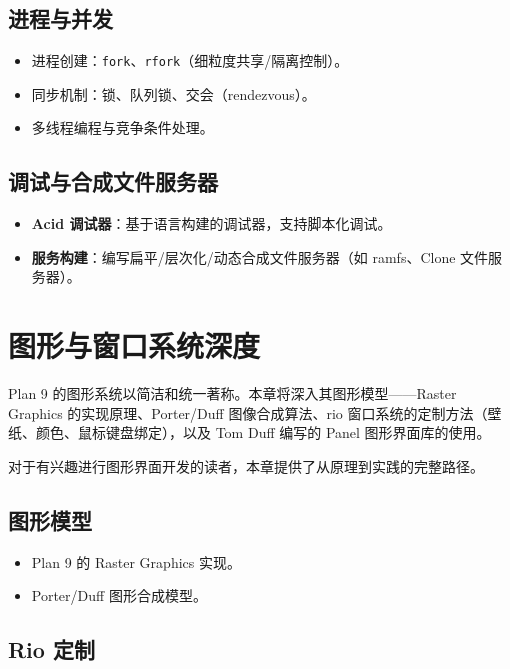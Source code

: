 \documentclass[12pt,UTF8]{ctexbook}
\begin{document}
\section{进程与并发}

\begin{itemize}
\item 进程创建：\texttt{fork}、\texttt{rfork}（细粒度共享/隔离控制）。
\item 同步机制：锁、队列锁、交会（rendezvous）。
\item 多线程编程与竞争条件处理。
\end{itemize}

\section{调试与合成文件服务器}

\begin{itemize}
\item \textbf{Acid 调试器}：基于语言构建的调试器，支持脚本化调试。
\item \textbf{服务构建}：编写扁平/层次化/动态合成文件服务器（如 ramfs、Clone 文件服务器）。
\end{itemize}

\chapter{图形与窗口系统深度}

Plan 9 的图形系统以简洁和统一著称。本章将深入其图形模型——Raster Graphics 的实现原理、Porter/Duff 图像合成算法、rio 窗口系统的定制方法（壁纸、颜色、鼠标键盘绑定），以及 Tom Duff 编写的 Panel 图形界面库的使用。

对于有兴趣进行图形界面开发的读者，本章提供了从原理到实践的完整路径。

\section{图形模型}

\begin{itemize}
\item Plan 9 的 Raster Graphics 实现。
\item Porter/Duff 图形合成模型。
\end{itemize}

\section{Rio 定制}
\end{document}
